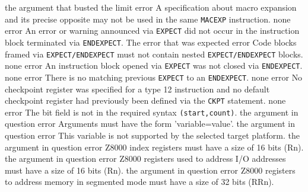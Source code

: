 \documentclass[12pt,twoside]{report}
\newcommand{\tty}[1]{{\tt #1}}
\begin{document}
\begin{description}
               {the argument that busted the limit}
               {error}
               {A specification about macro expansion and its
                precise opposite may not be used in the same
                \tty{MACEXP} instruction.}
               {none}
               {error}
               {An error or warning announced via {\tt EXPECT} did not occur in the
                instruction block terminated via {\tt ENDEXPECT}.}
               {The error that was expected}
               {error}
               {Code blocks framed via {\tt EXPECT/ENDEXPECT} must not contain
                nested {\tt EXPECT/ENDEXPECT} blocks.}
               {none}
               {error}
               {An instruction block opened via {\tt EXPECT} was not closed via
                {\tt ENDEXPECT}.}
               {none}
               {error}
               {There is no matching previous {\tt EXPECT} to an {\tt ENDEXPECT}.}
               {none}
               {error}
               {No checkpoint register was specified for a type 12 instruction
                and no default checkpoint register had previously been defined
                via the {\tt CKPT} statement.}
               {none}
               {error}
               {The bit field is not in the required syntax {\tt (start,count)}.}
               {the argument in question}
               {error}
               {Arguments must have the form 'variable=value'.}
               {the argument in question}
               {error}
               {This variable is not supported by the selected target platform.}
               {the argument in question}
               {error}
               {Z8000 index registers must have a size of 16 bits (Rn).}
               {the argument in question}
               {error}
               {Z8000 registers used to address I/O addresses must have a size of 16 bits (Rn).}
               {the argument in question}
               {error}
               {Z8000 registers to address memory in segmented mode must have a size of 32 bits (RRn).}

\end{description}
\end{document}
